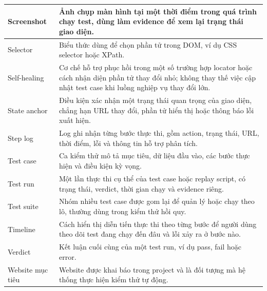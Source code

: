 {\begin{longtable}{|p{4.2cm}|p{10.0cm}|}
\hline
Screenshot & Ảnh chụp màn hình tại một thời điểm trong quá trình chạy test, dùng làm evidence để xem lại trạng thái giao diện. \\
\hline
Selector & Biểu thức dùng để chọn phần tử trong DOM, ví dụ CSS selector hoặc XPath. \\
\hline
Self-healing & Cơ chế hỗ trợ phục hồi trong một số trường hợp locator hoặc cách nhận diện phần tử thay đổi nhỏ; không thay thế việc cập nhật test case khi luồng nghiệp vụ thay đổi lớn. \\
\hline
State anchor & Điều kiện xác nhận một trạng thái quan trọng của giao diện, chẳng hạn URL thay đổi, phần tử hiển thị hoặc thông báo lỗi xuất hiện. \\
\hline
Step log & Log ghi nhận từng bước thực thi, gồm action, trạng thái, URL, thời điểm, lỗi và thông tin hỗ trợ phân tích. \\
\hline
Test case & Ca kiểm thử mô tả mục tiêu, dữ liệu đầu vào, các bước thực hiện và điều kiện kỳ vọng. \\
\hline
Test run & Một lần thực thi cụ thể của test case hoặc replay script, có trạng thái, verdict, thời gian chạy và evidence riêng. \\
\hline
Test suite & Nhóm nhiều test case được gom lại để quản lý hoặc chạy theo lô, thường dùng trong kiểm thử hồi quy. \\
\hline
Timeline & Cách hiển thị diễn tiến thực thi theo từng bước để người dùng theo dõi test đang chạy đến đâu và lỗi xảy ra ở bước nào. \\
\hline
Verdict & Kết luận cuối cùng của một test run, ví dụ pass, fail hoặc error. \\
\hline
Website mục tiêu & Website được khai báo trong project và là đối tượng mà hệ thống thực hiện kiểm thử tự động. \\
\hline
\end{longtable}
}
